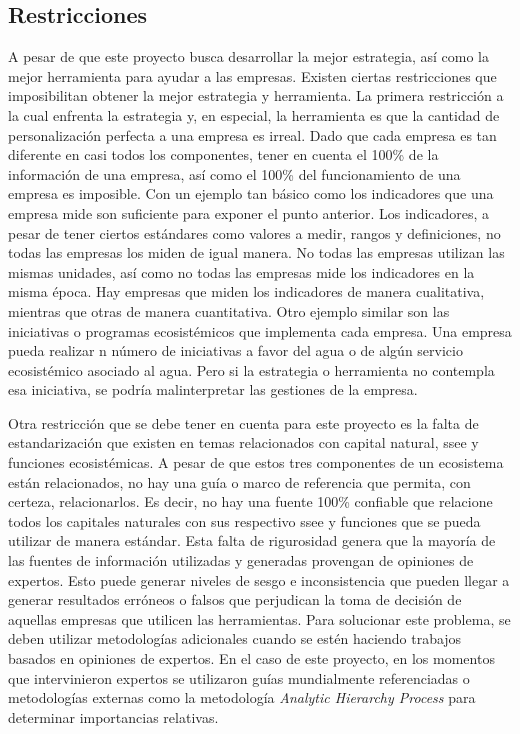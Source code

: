 \subsection{Restricciones}
A pesar de que este proyecto busca desarrollar la mejor estrategia, así como la mejor herramienta para ayudar a las empresas. Existen ciertas restricciones que imposibilitan obtener la mejor estrategia y herramienta. La primera restricción a la cual enfrenta la estrategia y, en especial, la herramienta es que la cantidad de personalización perfecta a una empresa es irreal. Dado que cada empresa es tan diferente en casi todos los componentes, tener en cuenta el 100\% de la información de una empresa, así como el 100\% del funcionamiento de una empresa es imposible. Con un ejemplo tan básico como los indicadores que una empresa mide son suficiente para exponer el punto anterior. Los indicadores, a pesar de tener ciertos estándares como valores a medir, rangos y definiciones, no todas las empresas los miden de igual manera. No todas las empresas utilizan las mismas unidades, así como no todas las empresas mide los indicadores en la misma época. Hay empresas que miden los indicadores de manera cualitativa, mientras que otras de manera cuantitativa. Otro ejemplo similar son las iniciativas o programas ecosistémicos que implementa cada empresa. Una empresa pueda realizar n número de iniciativas a favor del agua o de algún servicio ecosistémico asociado al agua. Pero si la estrategia o herramienta no contempla esa iniciativa, se podría malinterpretar las gestiones de la empresa.

\hfill

Otra restricción que se debe tener en cuenta para este proyecto es la falta de estandarización que existen en temas relacionados con capital natural, \acrshort{ssee} y funciones ecosistémicas. A pesar de que estos tres componentes de un ecosistema están relacionados, no hay una guía o marco de referencia que permita, con certeza, relacionarlos. Es decir, no hay una fuente 100\% confiable que relacione todos los capitales naturales con sus respectivo \acrshort{ssee} y funciones que se pueda utilizar de manera estándar. Esta falta de rigurosidad genera que la mayoría de las fuentes de información utilizadas y generadas provengan de opiniones de expertos. Esto puede generar niveles de sesgo e inconsistencia que pueden llegar a generar resultados erróneos o falsos que perjudican la toma de decisión de aquellas empresas que utilicen las herramientas. Para solucionar este problema, se deben utilizar metodologías adicionales cuando se estén haciendo trabajos basados en opiniones de expertos. En el caso de este proyecto, en los momentos que intervinieron expertos se utilizaron guías mundialmente referenciadas o metodologías externas como la metodología \textit{Analytic Hierarchy Process} para determinar importancias relativas. 

